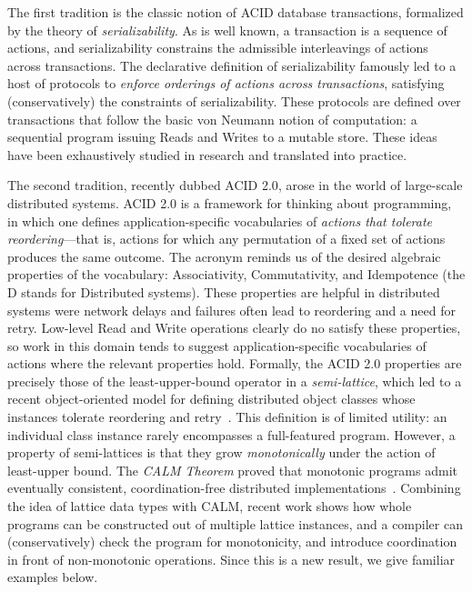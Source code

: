\documentclass{sig-alternate}
\begin{document}
The first tradition is the classic notion of \textsf{ACID} database transactions, formalized by the theory of \emph{serializability}.  As is well known, a transaction is a sequence of actions, and serializability constrains the admissible interleavings of actions across transactions.  The declarative definition of serializability famously led to a host of protocols to \emph{enforce orderings of actions across transactions}, satisfying (conservatively) the constraints of serializability.  These protocols are defined over transactions that follow the basic von Neumann notion of computation: a sequential program issuing Reads and Writes to a mutable store.  These ideas have been exhaustively studied in research and translated into practice.

The second tradition, recently dubbed \textsf{ACID 2.0}, arose in the world of large-scale distributed systems.  ACID 2.0 is a framework for thinking about programming, in which one defines application-specific vocabularies of \emph{actions that tolerate reordering}---that is, actions for which any permutation of a fixed set of actions produces the same outcome.  The acronym reminds us of the desired algebraic properties of the vocabulary: Associativity, Commutativity, and Idempotence (the D stands for Distributed systems).  These properties are helpful in distributed systems were network delays and failures often lead to reordering and a need for retry. Low-level Read and Write operations clearly do no satisfy these properties, so work in this domain tends to suggest application-specific vocabularies of actions where the relevant properties hold.  Formally, the ACID 2.0 properties are precisely those of the least-upper-bound operator in a {\em semi-lattice}, which led to a recent object-oriented model for defining distributed object classes whose instances tolerate reordering and retry~\cite{CRDTs}.  This definition is of limited utility: an individual class instance rarely encompasses a full-featured program.  However, a property of semi-lattices is that they grow \emph{monotonically} under the action of least-upper bound.  The \emph{CALM Theorem} proved that monotonic programs admit eventually consistent, coordination-free distributed implementations~\cite{calm}.  Combining the idea of lattice data types with CALM, recent work shows how whole programs can be constructed out of multiple lattice instances, and a compiler can (conservatively) check the program for monotonicity, and introduce coordination in front of non-monotonic operations.  Since this is a new result, we give familiar examples below.
\end{document}
